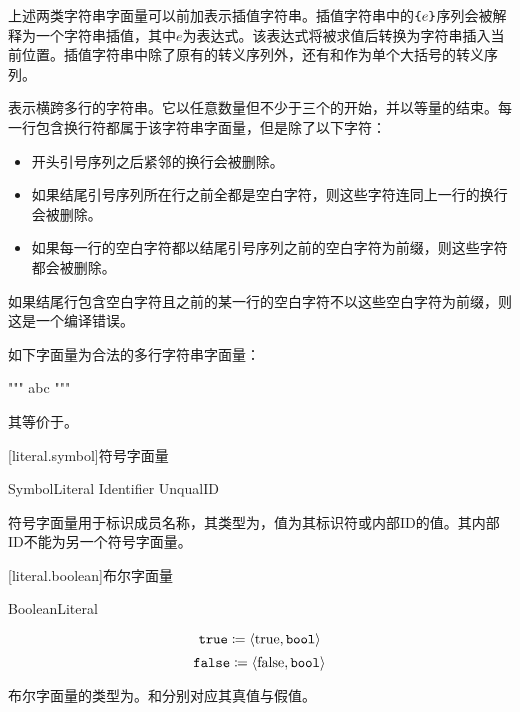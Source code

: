 \pnum
上述两类字符串字面量可以前加\tcode{\$}表示插值字符串。插值字符串中的$\texttt{\{}e\texttt{\}}$序列会被解释为一个字符串插值，其中$e$为表达式。该表达式将被求值后转换为字符串插入当前位置。插值字符串中除了原有的转义序列外，还有\tcode{\{\{}和\tcode{\}\}}作为单个大括号的转义序列。

\pnum
{}表示横跨多行的字符串。它以任意数量但不少于三个的开始，并以等量的结束。每一行包含换行符都属于该字符串字面量，但是除了以下字符：

\begin{itemize}
    \item 开头引号序列之后紧邻的换行会被删除。
    \item 如果结尾引号序列所在行之前全都是空白字符，则这些字符连同上一行的换行会被删除。
    \item 如果每一行的空白字符都以结尾引号序列之前的空白字符为前缀，则这些字符都会被删除。
\end{itemize}

如果结尾行包含空白字符且之前的某一行的空白字符不以这些空白字符为前缀，则这是一个编译错误。

\enterexample

如下字面量为合法的多行字符串字面量：

\begin{codeblock}
"""
abc
"""
\end{codeblock}

其等价于。

\exitexample

[literal.symbol]{符号字面量}

\begin{bnf}{SymbolLiteral}
     Identifier \br
     UnqualID \terminal{)}
\end{bnf}

\pnum
符号字面量用于标识成员名称，其类型为，值为其标识符或内部ID的值。其内部ID不能为另一个符号字面量。

[literal.boolean]{布尔字面量}

\begin{bnf}{BooleanLiteral}
     \br
\end{bnf}

$$ \texttt{true} \coloneqq \langle \mathrm{true}, \texttt{bool} \rangle $$
$$ \texttt{false} \coloneqq \langle \mathrm{false}, \texttt{bool} \rangle $$

\pnum
布尔字面量的类型为。和分别对应其真值与假值。


